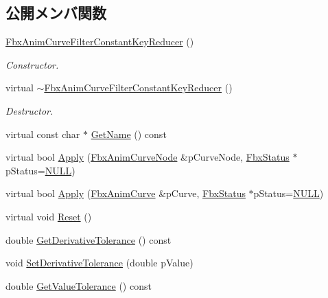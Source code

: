 \subsection*{公開メンバ関数}
\begin{DoxyCompactItemize}
\item 
\hyperlink{class_fbx_anim_curve_filter_constant_key_reducer_a5baf6160f4bf332b9235e0d1abb1aa3a}{Fbx\+Anim\+Curve\+Filter\+Constant\+Key\+Reducer} ()
\begin{DoxyCompactList}\small\item\em Constructor. \end{DoxyCompactList}\item 
virtual \hyperlink{class_fbx_anim_curve_filter_constant_key_reducer_a523519a310cf98a3823b221ab9973069}{$\sim$\+Fbx\+Anim\+Curve\+Filter\+Constant\+Key\+Reducer} ()
\begin{DoxyCompactList}\small\item\em Destructor. \end{DoxyCompactList}\item 
virtual const char $\ast$ \hyperlink{class_fbx_anim_curve_filter_constant_key_reducer_a1f856490df5d301d1c1e202958a3240c}{Get\+Name} () const
\item 
virtual bool \hyperlink{class_fbx_anim_curve_filter_constant_key_reducer_a54f43929707bc95bc5d0830ec039fde2}{Apply} (\hyperlink{class_fbx_anim_curve_node}{Fbx\+Anim\+Curve\+Node} \&p\+Curve\+Node, \hyperlink{class_fbx_status}{Fbx\+Status} $\ast$p\+Status=\hyperlink{fbxarch_8h_a070d2ce7b6bb7e5c05602aa8c308d0c4}{N\+U\+LL})
\item 
virtual bool \hyperlink{class_fbx_anim_curve_filter_constant_key_reducer_a45c9f6f26dc37686d684e1a35ac6b4c0}{Apply} (\hyperlink{class_fbx_anim_curve}{Fbx\+Anim\+Curve} \&p\+Curve, \hyperlink{class_fbx_status}{Fbx\+Status} $\ast$p\+Status=\hyperlink{fbxarch_8h_a070d2ce7b6bb7e5c05602aa8c308d0c4}{N\+U\+LL})
\item 
virtual void \hyperlink{class_fbx_anim_curve_filter_constant_key_reducer_a6961f8cd2d86b3f0b0c503c021bac93b}{Reset} ()
\item 
double \hyperlink{class_fbx_anim_curve_filter_constant_key_reducer_adae1590528c85fe9c4186652c97d8d19}{Get\+Derivative\+Tolerance} () const
\item 
void \hyperlink{class_fbx_anim_curve_filter_constant_key_reducer_ac0db44875a6a8d68e41a331948e8bf1f}{Set\+Derivative\+Tolerance} (double p\+Value)
\item 
double \hyperlink{class_fbx_anim_curve_filter_constant_key_reducer_a0ff1db2f653a0217e0560550be3d947f}{Get\+Value\+Tolerance} () const

\end{DoxyCompactItemize}
